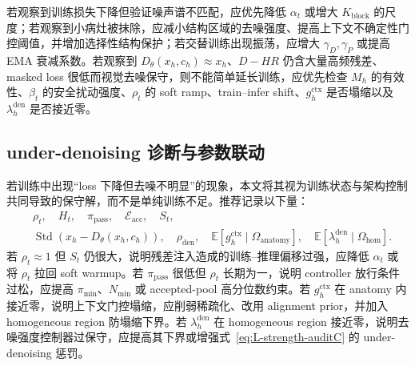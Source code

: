 \documentclass[11pt,a4paper,UTF8,fontset=fandol]{ctexart}
\theoremstyle{definition}
\DeclareMathOperator{\Std}{Std}
\newcommand{\E}{\mathbb{E}}
\begin{document}
若观察到训练损失下降但验证噪声谱不匹配，应优先降低 $\alpha_t$ 或增大 $K_{\mathrm{block}}$ 的尺度；若观察到小病灶被抹除，应减小结构区域的去噪强度、提高上下文不确定性门控阈值，并增加选择性结构保护；若交替训练出现振荡，应增大 $\gamma_D,\gamma_P$ 或提高 EMA 衰减系数。若观察到 $D_\theta(x_h,c_h)\approx x_h$、$D-HR$ 仍含大量高频残差、masked loss 很低而视觉去噪保守，则不能简单延长训练，应优先检查 $M_h$ 的有效性、$\beta_t$ 的安全扰动强度、$\rho_t$ 的 soft ramp、train--infer shift、$g_h^{\mathrm{ctx}}$ 是否塌缩以及 $\lambda_h^{\mathrm{den}}$ 是否接近零。

\subsection{under-denoising 诊断与参数联动}

若训练中出现“loss 下降但去噪不明显”的现象，本文将其视为训练状态与架构控制共同导致的保守解，而不是单纯训练不足。推荐记录以下量：
\begin{align}
    &\rho_t,\quad H_t,\quad \pi_{\mathrm{pass}},\quad \mathcal E_{\mathrm{acc}},\quad S_t,\\
    &\Std(x_h-D_\theta(x_h,c_h)),\quad \rho_{\mathrm{den}},\quad
    \E[g_h^{\mathrm{ctx}}\mid\Omega_{\mathrm{anatomy}}],\quad
    \E[\lambda_h^{\mathrm{den}}\mid\Omega_{\mathrm{hom}}].
\end{align}
若 $\rho_t\approx1$ 但 $S_t$ 仍很大，说明残差注入造成的训练--推理偏移过强，应降低 $\alpha_t$ 或将 $\rho_t$ 拉回 soft warmup。若 $\pi_{\mathrm{pass}}$ 很低但 $\rho_t$ 长期为一，说明 controller 放行条件过松，应提高 $\pi_{\min}$、$N_{\min}$ 或 accepted-pool 高分位数约束。若 $g_h^{\mathrm{ctx}}$ 在 anatomy 内接近零，说明上下文门控塌缩，应削弱稀疏化、改用 alignment prior，并加入 homogeneous region 防塌缩下界。若 $\lambda_h^{\mathrm{den}}$ 在 homogeneous region 接近零，说明去噪强度控制器过保守，应提高其下界或增强式~\eqref{eq:L-strength-auditC} 的 under-denoising 惩罚。
\end{document}
